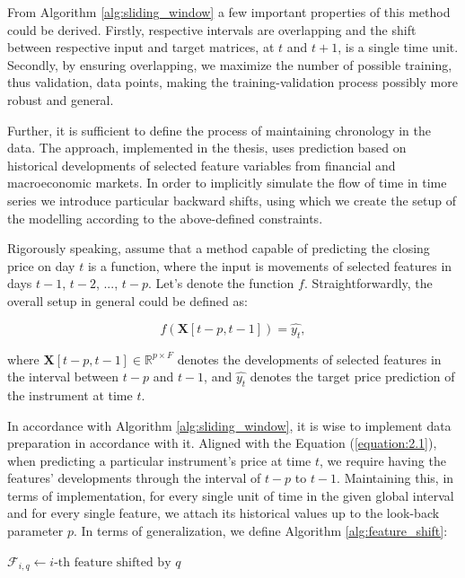 From Algorithm \ref{alg:sliding_window} a few important properties of this method could be derived.
Firstly, respective intervals are overlapping and the shift between respective input and target matrices, at $t$ and $t+1$,
is a single time unit. Secondly, by ensuring overlapping, we maximize the number of possible training, thus validation, data points, making the training-validation process possibly more robust and general.
\newline
\par
Further, it is sufficient to define the process of maintaining chronology in the data.
The approach, implemented in the thesis, uses prediction based on historical developments of selected feature variables
from financial and macroeconomic markets. In order to implicitly simulate the flow of time in time series we introduce particular 
backward shifts, using which we create the setup of the modelling according to the above-defined constraints.
\par
Rigorously speaking, assume that a method capable of predicting the closing price on day $t$ is a function, where the input is movements 
of selected features in days $t-1$, $t-2$, ..., $t-p$. Let's denote the function $f$. Straightforwardly, the overall setup in general could be defined as:

\begin{equation}
    \label{equation:2.1}
    f(\mathbf{X}[t-p, t-1]) = \hat{y_{t}},
\end{equation}

where $\mathbf{X}[t-p, t-1] \in \mathbb{R}^{p \times F}$ denotes the developments
of selected features in the interval between $t-p$ and $t-1$, and $\hat{y_{t}}$ denotes the target price prediction of the instrument at time $t$.  
\par
In accordance with Algorithm \ref{alg:sliding_window}, it is wise to implement data preparation in accordance with it. Aligned with the Equation (\ref{equation:2.1}),
when predicting a particular instrument's price at time $t$, we require having the features' developments through the interval of $t-p$ to $t-1$. Maintaining this, in terms of implementation, for every single
unit of time in the given global interval and for every single feature, we attach its historical values up to the look-back parameter $p$. In terms of generalization, we define Algorithm \ref{alg:feature_shift}:
\newline

\begin{algorithm}[H]
\caption{Feature shifting procedure}
\label{alg:feature_shift}

\begin{algorithmic}
        \State $\mathcal{F}_{i,q} \gets \text{$i$-th feature shifted by $q$}$
    \EndFor
\EndFor
\end{algorithmic}
\end{algorithm}



